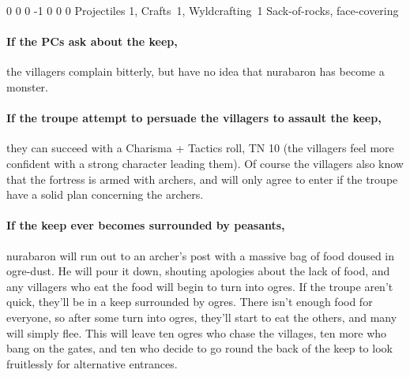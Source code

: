 {0}%
{0}%
{{0}%
{-1}%
{0}}%
{0}%
{0}%
{Projectiles 1, Crafts~1, Wyldcrafting~1}%
{Sack-of-rocks, face-covering}%
{}

\paragraph{If the PCs ask about the keep,}
the villagers complain bitterly, but have no idea that \gls{nurabaron} has become a monster.

\paragraph{If the troupe attempt to persuade the villagers to assault the keep,}
they can succeed with a Charisma + Tactics roll, TN 10
(the villagers feel more confident with a strong character leading them).
Of course the villagers also know that the fortress is armed with archers, and will only agree to enter if the troupe have a solid plan concerning the archers.

\paragraph{If the keep ever becomes surrounded by peasants,}
\gls{nurabaron} will run out to an archer's post with a massive bag of food doused in ogre-dust.
He will pour it down, shouting apologies about the lack of food, and any villagers who eat the food will begin to turn into ogres.
If the troupe aren't quick, they'll be in a keep surrounded by ogres.
There isn't enough food for everyone, so after some turn into ogres, they'll start to eat the others, and many will simply flee.
This will leave ten ogres who chase the villages, ten more who bang on the gates, and ten who decide to go round the back of the keep to look fruitlessly for alternative entrances.



